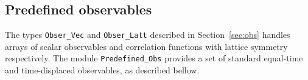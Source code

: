 %
\subsection{Predefined observables} \label{sec:predefined_observales}

The types \texttt{Obser\_Vec} and \texttt{Obser\_Latt} described in Section~\ref{sec:obs} handles arrays of scalar observables and correlation functions with lattice symmetry respectively. The module \texttt{Predefined\_Obs} provides a set of standard equal-time and time-displaced observables, as described bellow.

